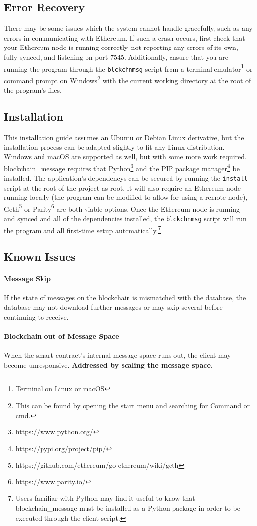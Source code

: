 \documentclass[titlepage]{report}
\begin{document}
\subsection{Error Recovery}
There may be some issues which the system cannot handle gracefully, such as any errors in communicating with \gls{Ethereum}. If such a crash occurs, first check that your \gls{Ethereum} \gls{node} is running correctly, not reporting any errors of its own, fully \gls{synced}, and listening on port 7545. Additionally, ensure that you are running the program through the \texttt{blckchnmsg} script from a terminal emulator\footnote{Terminal on Linux or macOS} or command prompt on Windows\footnote{This can be found by opening the start menu and searching for Command or cmd.} with the current working directory at the root of the program's files.

\subsection{Installation}
This installation guide assumes an Ubuntu or Debian Linux derivative, but the installation process can be adapted slightly to fit any Linux distribution. Windows and macOS are supported as well, but with some more work required. blockchain\_message requires that Python\footnote{https://www.python.org/} and the PIP package manager\footnote{https://pypi.org/project/pip/} be installed. The application's \glspl{dependency} can be secured by running the \texttt{install} script at the root of the project as root. It will also require an \gls{Ethereum} \gls{node} running locally (the program can be modified to allow for using a remote \gls{node}), Geth\footnote{https://github.com/ethereum/go-ethereum/wiki/geth} or Parity\footnote{https://www.parity.io/} are both viable options. Once the Ethereum \gls{node} is running and \gls{synced} and all of the dependencies installed, the \texttt{blckchnmsg} script will run the program and all first-time setup automatically.\footnote{Users familiar with Python may find it useful to know that blockchain\_message must be installed as a Python package in order to be executed through the client script.}

\subsection{Known Issues}
\paragraph{Message Skip}
If the state of messages on the \gls{blockchain} is mismatched with the database, the database may not download further messages or may skip several before continuing to receive.
\paragraph{Blockchain out of Message Space}
When the smart contract's internal message space runs out, the client may become unresponsive. \textbf{Addressed by scaling the message space.}

\pagebreak

\printindex
\printglossaries{}
\printbibliography{}
\end{document}
